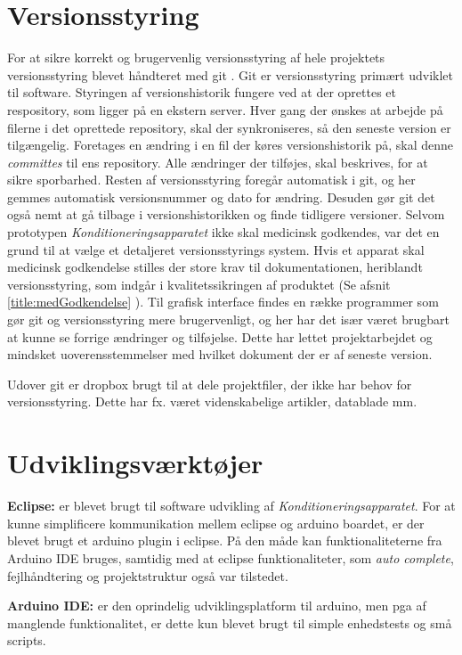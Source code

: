 \section{Versionsstyring} \label{title:versionsstyring}
For at sikre korrekt og brugervenlig versionsstyring af hele projektets versionsstyring blevet håndteret med git . Git er versionsstyring primært udviklet til software. Styringen af versionshistorik fungere ved at der oprettes et respository, som ligger på en ekstern server. Hver gang der ønskes at arbejde på filerne i det oprettede repository, skal der synkroniseres, så den seneste version er tilgængelig. Foretages en ændring i en fil der køres versionshistorik på, skal denne \textit{committes} til ens repository. Alle ændringer der tilføjes, skal beskrives, for at sikre sporbarhed. Resten af versionsstyring foregår automatisk i git, og her gemmes automatisk versionsnummer og dato for ændring. Desuden gør git det også nemt at gå tilbage i versionshistorikken og finde tidligere versioner. 
Selvom prototypen \textit{Konditioneringsapparatet} ikke skal medicinsk godkendes, var det en grund til at vælge et detaljeret versionsstyrings system. Hvis et apparat skal medicinsk godkendelse stilles der store krav til dokumentationen, heriblandt versionsstyring, som indgår i kvalitetssikringen af produktet (Se afsnit \ref{title:medGodkendelse} ). 
Til grafisk interface findes en række programmer som gør git og versionsstyring mere brugervenligt, og her har det især været brugbart at kunne se forrige ændringer og tilføjelse. Dette har lettet projektarbejdet og mindsket uoverensstemmelser med hvilket dokument der er af seneste version. 

Udover git er dropbox brugt til at dele projektfiler, der ikke har behov for versionsstyring. Dette har fx. været videnskabelige artikler, datablade mm. 

\section{Udviklingsværktøjer}
\textbf{Eclipse:} er blevet brugt til software udvikling af \textit{Konditioneringsapparatet}. For at kunne simplificere kommunikation mellem eclipse og arduino boardet, er der blevet brugt et arduino plugin i eclipse. På den måde kan funktionaliteterne fra Arduino IDE bruges, samtidig med at eclipse funktionaliteter, som \textit{auto complete}, fejlhåndtering og projektstruktur også var tilstedet. 

\textbf{Arduino IDE:} er den oprindelig udviklingsplatform til arduino, men pga af manglende funktionalitet, er dette kun blevet brugt til simple enhedstests og små scripts. 

